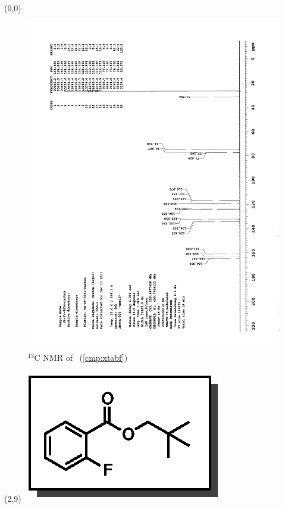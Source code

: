 \clearpage
\begin{textblock}{20}(0,0)
\begin{figure}[htb]
\caption{$^{13}$C NMR of  \CMPxtabf\ (\ref{cmp:xtabf})}
\includegraphics[scale=0.75, trim = 0mm 0mm 0mm 5mm,
clip]{chp_asymmetric/images/nmr/xtabfC}
\vspace{-100pt}
\end{figure}
\end{textblock}
\begin{textblock}{1}(2,9)
\includegraphics[scale=0.8, angle=90]{chp_asymmetric/images/xtabf}
\end{textblock}
